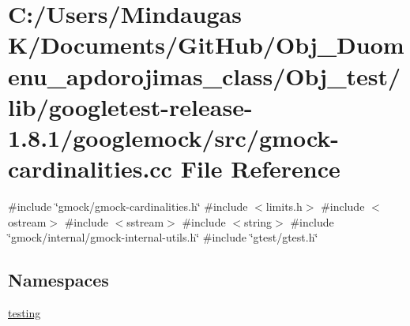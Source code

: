 \hypertarget{_obj__test_2lib_2googletest-release-1_88_81_2googlemock_2src_2gmock-cardinalities_8cc}{}\section{C\+:/\+Users/\+Mindaugas K/\+Documents/\+Git\+Hub/\+Obj\+\_\+\+Duomenu\+\_\+apdorojimas\+\_\+class/\+Obj\+\_\+test/lib/googletest-\/release-\/1.8.1/googlemock/src/gmock-\/cardinalities.cc File Reference}
\label{_obj__test_2lib_2googletest-release-1_88_81_2googlemock_2src_2gmock-cardinalities_8cc}
{\ttfamily \#include \char`\"{}gmock/gmock-\/cardinalities.\+h\char`\"{}}\newline
{\ttfamily \#include $<$limits.\+h$>$}\newline
{\ttfamily \#include $<$ostream$>$}\newline
{\ttfamily \#include $<$sstream$>$}\newline
{\ttfamily \#include $<$string$>$}\newline
{\ttfamily \#include \char`\"{}gmock/internal/gmock-\/internal-\/utils.\+h\char`\"{}}\newline
{\ttfamily \#include \char`\"{}gtest/gtest.\+h\char`\"{}}\newline
\subsection*{Namespaces}
\begin{DoxyCompactItemize}
\item 
 \mbox{\hyperlink{namespacetesting}{testing}}
\end{DoxyCompactItemize}
